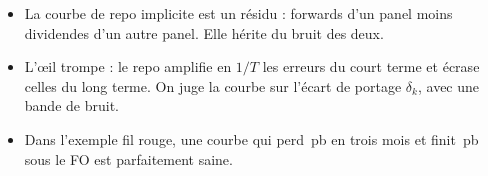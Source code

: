 \begin{retenir}
\begin{itemize}[leftmargin=12pt]
\item La courbe de repo implicite est un résidu : forwards d'un panel moins dividendes d'un autre panel. Elle hérite du
bruit des deux.
\item L'œil trompe : le repo amplifie en $1/T$ les erreurs du court terme et écrase celles du long terme. On juge la
courbe sur l'écart de portage $\delta_k$, avec une bande de bruit.
\item Dans l'exemple fil rouge, une courbe qui perd \vRunDrop\,pb en trois mois et finit \vRunGapLong\,pb sous
le FO est parfaitement saine.
\end{itemize}
\end{retenir}
